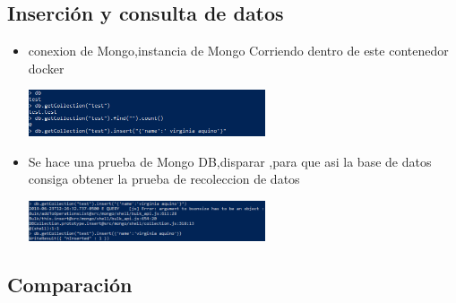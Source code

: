 \documentclass[%
 reprint,
 amsmath,amssymb,
 aps,
]{revtex4-1}
\begin{document}
\subsection{Inserción y consulta de datos}
                     \begin{itemize}
		\item conexion de Mongo,instancia de Mongo Corriendo dentro de este contenedor docker 
                      \begin{center}
		\includegraphics[width=7cm]{./Imagenes/26}
		\end{center}	
		\item Se hace una prueba de Mongo DB,disparar ,para que asi  la base de datos consiga obtener la prueba de recoleccion de datos 
                     \begin{center}
		\includegraphics[width=7cm]{./Imagenes/27}
		\end{center}	
                  
	          \end{itemize}
\subsection{Comparación}
\end{document}
